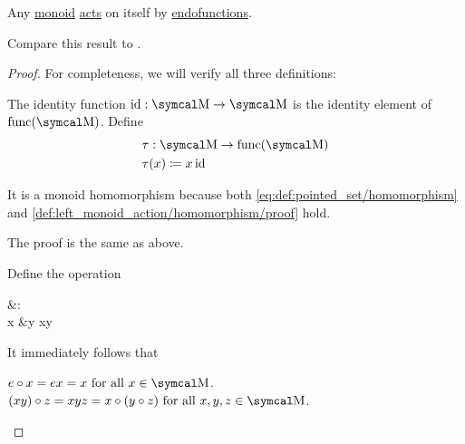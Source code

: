 \begin{proposition}\label{thm:monoid_is_action}
  Any \hyperref[def:unital_magma/associative]{monoid} \hyperref[def:left_monoid_action]{acts} on itself by \hyperref[def:endofunction]{endofunctions}.

  Compare this result to .
\end{proposition}
\begin{proof}
  For completeness, we will verify all three definitions:

   The identity function \( \Id: \CM \to \CM \) is the identity element of \( \Func(\CM) \). Define
  \begin{align*}
    &\tau: \CM \to \Func(\CM) \\
    &\tau(x) \coloneqq x \Id
  \end{align*}

  It is a monoid homomorphism because both \eqref{eq:def:pointed_set/homomorphism} and \eqref{def:left_monoid_action/homomorphism/proof} hold.

   The proof is the same as above.

   Define the operation
  \begin{BreakableAlign*}
    {}&\odot{}: \CM \times \CM \to \CM \\
    x &\odot y \coloneqq xy
  \end{BreakableAlign*}

  It immediately follows that
  \begin{RefList}
     \( e \circ x = ex = x \Tforall x \in \CM \).
     \( (x y) \circ z = xyz = x \circ (y \circ z) \Tforall x, y, z \in \CM \).
  \end{RefList}
\end{proof}
